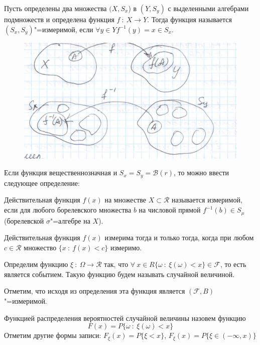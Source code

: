 \begin{definition}
Пусть определены два множества $(X, S_x$) в 
$(Y, S_y)$ с выделенными алгебрами подмножеств и
определена функция $f ~:~ X \rightarrow Y$. Тогда
функция называется $(S_x, S_y)$"=измеримой,
если $\forall y \in Y f^{-1}(y) = x \in S_x$.
\end{definition}
\begin{figure}[H]
    \centering
    \includegraphics[scale=0.5]{images/izmer.png}
\end{figure}
Если функция вещественнозначная и $S_x = S_y = \mathcal{B}(r)$, то можно
ввести следующее определение:
\begin{definition}
    Действительная функция $f(x)$ на множестве
    $X \subset \mathcal{R}$ называется измеримой, если для любого
    борелевского множества $b$ на числовой прямой $f^{-1}(b) \in S_\mu$(борелевской $\sigma$"=алгебре на $X$).
\end{definition}

\begin{theorem}
    Действительная функция $f(x)$ измерима тогда и только тогда, когда
    при любом $c \in \mathcal{R}$ множество $\{x ~:~ f(x) < c\}$ измеримо.
\end{theorem}


\begin{definition}
    Определим функцию $\xi ~:~ \Omega \rightarrow \mathcal{R}$ так, что
    $\forall~ x \in R \{\omega ~:~ \xi(\omega) < x\} \in \mathcal{F}$, то есть
    является событием. Такую функцию будем называть случайной величиной.
\end{definition}
Отметим, что исходя из определения эта функция является $(\mathcal{F}, B)$"=измеримой.

\begin{definition}
    Функцией распределения вероятностей случайной величины
    назовем функцию 
    \begin{equation*}
        F(x) = P\{\omega ~:~ \xi(\omega) < x\}    
    \end{equation*}
    Отметим другие формы записи: $F_\xi(x) = P\{\xi < x\}$, $F_\xi(x) = P\{\xi \in (-\infty, x)\}$
\end{definition}

